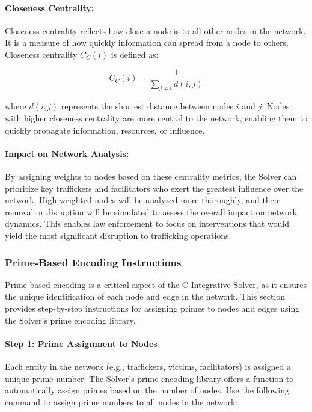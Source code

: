 \documentclass[%
 preprint, linenumbers,
 amsmath,amssymb,
 aps, physrev,
]{revtex4-2}
\begin{document}
\paragraph{Closeness Centrality:}
Closeness centrality reflects how close a node is to all other nodes in the network. It is a measure of how quickly information can spread from a node to others. Closeness centrality \(C_C(i)\) is defined as:

\[
C_C(i) = \frac{1}{\sum_{j \neq i} d(i,j)}
\]

where \(d(i,j)\) represents the shortest distance between nodes \(i\) and \(j\). Nodes with higher closeness centrality are more central to the network, enabling them to quickly propagate information, resources, or influence.

\paragraph{Impact on Network Analysis:}
By assigning weights to nodes based on these centrality metrics, the Solver can prioritize key traffickers and facilitators who exert the greatest influence over the network. High-weighted nodes will be analyzed more thoroughly, and their removal or disruption will be simulated to assess the overall impact on network dynamics. This enables law enforcement to focus on interventions that would yield the most significant disruption to trafficking operations.

\subsubsection{Prime-Based Encoding Instructions}

Prime-based encoding is a critical aspect of the C-Integrative Solver, as it ensures the unique identification of each node and edge in the network. This section provides step-by-step instructions for assigning primes to nodes and edges using the Solver’s prime encoding library.

\paragraph{Step 1: Prime Assignment to Nodes}
Each entity in the network (e.g., traffickers, victims, facilitators) is assigned a unique prime number. The Solver's prime encoding library offers a function to automatically assign primes based on the number of nodes. Use the following command to assign prime numbers to all nodes in the network:
\end{document}
